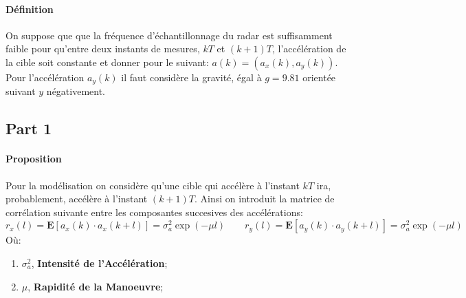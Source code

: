 \documentclass{article}
\begin{document}
\paragraph{Définition}On suppose que que la fréquence d'échantillonnage du radar est suffisamment faible pour qu'entre deux instants de mesures, $kT$ et $(k+1)T$, l'accélération de la cible soit constante et donner pour le suivant: $a(k) = (a_{x}(k), a_{y}(k))$. Pour l'accélération $a_{y}(k)$ il faut considère la gravité, égal à $g = 9.81$ orientée suivant $y$ négativement.
\subsection{Part 1}
\paragraph{Proposition}Pour la modélisation on considère qu'une cible qui accélère à l'instant $kT$ ira, probablement, accélère à l'instant $(k+1)T$. Ainsi on introduit la matrice de corrélation \cite{jacobianCovariance} suivante entre les composantes succesives des accélérations:
\begin{equation}
    r_{x} (l) = \mathbf{E}[a_{x}(k) \cdot a_{x}(k+l)] = \sigma_{a}^{2} \exp{(-\mu l)}
    \qquad
    r_{y} (l) = \mathbf{E}[a_{y}(k) \cdot a_{y}(k+l)] = \sigma_{a}^{2} \exp{(-\mu l)}
\end{equation}
\noindent Où:
\begin{enumerate}[noitemsep]
    \item $\sigma_{a}^{2}$, \textbf{Intensité de l'Accélération};
    \item $\mu$, \textbf{Rapidité de la Manoeuvre};
\end{enumerate}
\end{document}
